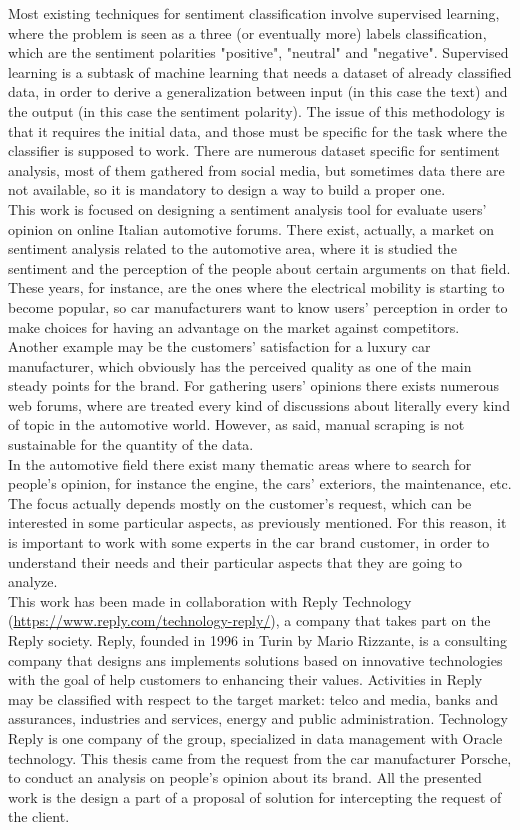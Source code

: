 Most existing techniques for sentiment classification involve supervised learning, where the problem is seen as a three (or eventually more) labels classification, which are the sentiment polarities "positive", "neutral" and "negative". Supervised learning is a subtask of machine learning that needs a dataset of already classified data, in order to derive a generalization between input (in this case the text) and the output (in this case the sentiment polarity). The issue of this methodology is that it requires the initial data, and those must be specific for the task where the classifier is supposed to work. There are numerous dataset specific for sentiment analysis, most of them gathered from social media, but sometimes data there are not available, so it is mandatory to design a way to build a proper one.\\
This work is focused on designing a sentiment analysis tool for evaluate users' opinion on online Italian automotive forums. There exist, actually, a market on sentiment analysis related to the automotive area, where it is studied the sentiment and the perception of the people about certain arguments on that field. These years, for instance, are the ones where the electrical mobility is starting to become popular, so car manufacturers want to know users' perception in order to make choices for having an advantage on the market against competitors. Another example may be the customers' satisfaction for a luxury car manufacturer, which obviously has the perceived quality as one of the main steady points for the brand. For gathering users' opinions there exists numerous web forums, where are treated every kind of discussions about literally every kind of topic in the automotive world. However, as said, manual scraping is not sustainable for the quantity of the data.\\
In the automotive field there exist many thematic areas where to search for people's opinion, for instance the engine, the cars' exteriors, the maintenance, etc. The focus actually depends mostly on the customer's request, which can be interested in some particular aspects, as previously mentioned. For this reason, it is important to work with some experts in the car brand customer, in order to understand their needs and their particular aspects that they are going to analyze.\\
This work has been made in collaboration with Reply Technology (\url{https://www.reply.com/technology-reply/}), a company that takes part on the Reply society. Reply, founded in 1996 in Turin by Mario Rizzante, is a consulting company that designs ans implements solutions based on innovative technologies with the goal of help customers to enhancing their values. Activities in Reply may be classified with respect to the target market: telco and media, banks and assurances, industries and services, energy and public administration. Technology Reply is one company of the group, specialized in data management with Oracle technology. This thesis came from the request from the car manufacturer Porsche, to conduct an analysis on people's opinion about its brand. All the presented work is the design a part of a proposal of solution for intercepting the request of the client.\\
